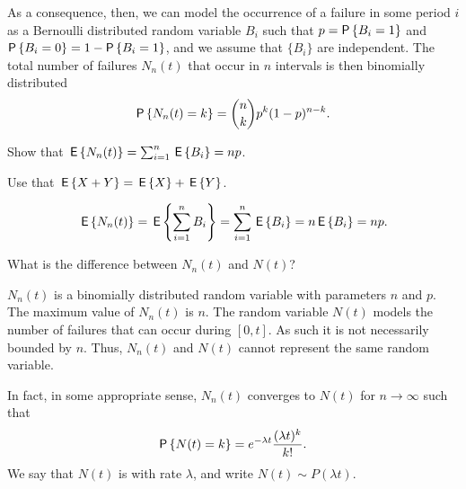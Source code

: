 As a consequence, then, we can model the occurrence of a failure in
some period $i$ as a Bernoulli distributed random variable $B_i$ such
that $p=\P{B_i =1}$ and $\P{B_i=0} = 1-\P{B_i = 1}$, and we assume that
$\{B_i\}$ are independent. The total number of failures $N_n(t)$ that
occur in $n$ intervals is then binomially distributed
\begin{equation}\label{eq:bin}
  \P{N_n(t) = k} = {n \choose k} p^k (1-p)^{n-k}.
\end{equation}

\begin{question}
Show that $\,\mathsf{E}\left\{N_n(t)\right\} = \sum_{i=1}^n \,\mathsf{E}\left\{B_i\right\} = n p$.
\begin{hint}
Use that $\,\mathsf{E}\left\{X+Y\right\} = \,\mathsf{E}\left\{X\right\} + \,\mathsf{E}\left\{Y\right\}$. 
\end{hint}
\begin{solution}
  \begin{equation*}
    \,\mathsf{E}\left\{N_n(t)\right\} = \,\mathsf{E}\left\{\sum_{i=1}^n {B_i}\right\} = \sum_{i=1}^n \,\mathsf{E}\left\{B_i\right\} = n \,\mathsf{E}\left\{B_i\right\} = n p.
  \end{equation*}
\end{solution}
\end{question}

\begin{question}
What is the difference between $N_n(t)$ and $N(t)$?
\begin{solution}
  $N_n(t)$ is a binomially distributed random variable with parameters
  $n$ and $p$. The maximum value of $N_n(t)$ is $n$. The random
  variable $N(t)$ models the number of failures that can occur during
  $[0,t]$. As such it is not necessarily bounded by $n$. Thus, $N_n(t)$ and $N(t)$ cannot represent the same random variable. 
\end{solution}
\end{question}


In fact, in some appropriate sense, $N_n(t)$ converges to $N(t)$ for $n\to \infty$ such
that
\begin{equation}\label{eq:pois}
  \P{N(t) = k} = 
e^{-\lambda t} \frac{(\lambda t)^k}{k!}.
\end{equation}
We say that $N(t)$ is  with rate
$\lambda$, and write $N(t)\sim P(\lambda t)$. 

